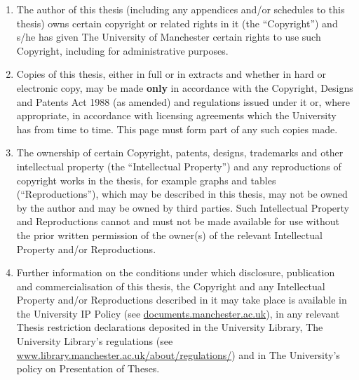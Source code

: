 \begin{copyrightstatement}
    \addchaptertocentry{\copyrightname} %

    \begin{enumerate}[label=(\roman*)]
        \item The author of this thesis (including any appendices and/or schedules to this thesis) owns certain copyright or related rights in it (the ``Copyright'') and s/he has given The University of Manchester certain rights to use such Copyright, including for administrative purposes.\\[0.3cm]

        \item Copies of this thesis, either in full or in extracts and whether in hard or electronic copy, may be made \textbf{only} in accordance with the Copyright, Designs and Patents Act 1988 (as amended) and regulations issued under it or, where appropriate, in accordance with licensing agreements which the University has from time to time. This page must form part of any such copies made.\\[0.3cm]

        \item The ownership of certain Copyright, patents, designs, trademarks and other intellectual property (the ``Intellectual Property'') and any reproductions of copyright works in the thesis, for example graphs and tables (``Reproductions''), which may be described in this thesis, may not be owned by the author and may be owned by third parties. Such Intellectual Property and Reproductions cannot and must not be made available for use without the prior written permission of the owner(s) of the relevant Intellectual Property and/or Reproductions.\\[0.3cm]

        \item Further information on the conditions under which disclosure, publication and commercialisation of this thesis, the Copyright and any Intellectual Property and/or Reproductions described in it may take place is available in the University IP Policy (see \href{http://documents.manchester.ac.uk/DocuInfo.aspx?DocID=24420}{documents.manchester.ac.uk}), in any relevant Thesis restriction declarations deposited in the University Library, The University Library’s regulations (see \href{http://www.library.manchester.ac.uk/about/regulations/}{www.library.manchester.ac.uk/about/regulations/}) and in The University’s policy on Presentation of Theses.
        
    \end{enumerate}
    \end{copyrightstatement}